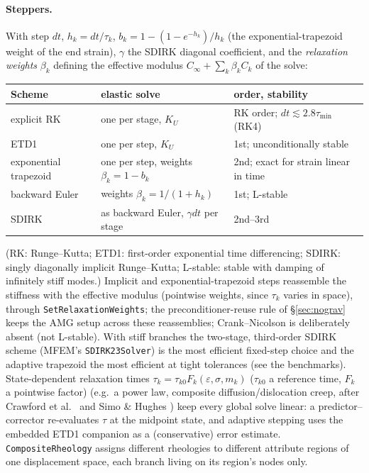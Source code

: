 \documentclass[11pt]{article}
\numberwithin{equation}{section}
\theoremstyle{remark}
\newcommand{\eps}{\varepsilon}
\newcommand{\code}[1]{\texttt{#1}}
\begin{document}
\paragraph{Steppers.} With step $dt$, $h_k = dt/\tau_k$,
$b_k = 1 - (1 - e^{-h_k})/h_k$ (the exponential-trapezoid weight of the end
strain), $\gamma$ the SDIRK diagonal coefficient, and the \emph{relaxation
weights} $\beta_k$ defining the effective modulus $C_\infty + \sum_k\beta_kC_k$
of the solve:
\begin{center}
\small
\begin{tabular}{@{}P{3.4cm}P{5.4cm}P{4.6cm}@{}}
\toprule
Scheme & elastic solve & order, stability \\
\midrule
explicit RK & one per stage, $K_U$ & RK order; $dt\lesssim2.8\tau_{\min}$ (RK4) \\
ETD1 & one per step, $K_U$ & 1st; unconditionally stable \\
exponential trapezoid & one per step, weights $\beta_k = 1 - b_k$ & 2nd; exact for strain linear in time \\
backward Euler & weights $\beta_k = 1/(1+h_k)$ & 1st; L-stable \\
SDIRK & as backward Euler, $\gamma dt$ per stage & 2nd--3rd \\
\bottomrule
\end{tabular}
\end{center}
(RK: Runge--Kutta; ETD1: first-order exponential time differencing;
SDIRK: singly diagonally implicit Runge--Kutta; L-stable: stable with
damping of infinitely stiff modes.) Implicit and exponential-trapezoid steps
reassemble the stiffness with the effective modulus (pointwise weights,
since $\tau_k$ varies in space), through \code{SetRelaxationWeights}; the
preconditioner-reuse rule of \S\ref{sec:nograv} keeps the AMG setup across
these reassemblies; Crank--Nicolson is
deliberately absent (not L-stable). With stiff branches the
two-stage, third-order SDIRK scheme (MFEM's \code{SDIRK23Solver}) is the most efficient fixed-step choice and the
adaptive trapezoid the most efficient at tight tolerances (see the
benchmarks).
State-dependent relaxation times $\tau_k = \tau_{k0}F_k(\eps,\sigma,m_k)$
($\tau_{k0}$ a reference time, $F_k$ a pointwise factor)
(e.g.\ a power law, composite diffusion/dislocation creep, after Crawford et
al.\ \cite{Crawford2017} and Simo \& Hughes \cite{SimoHughes}) keep every
global solve linear: a predictor--corrector re-evaluates $\tau$ at the
midpoint state, and adaptive stepping uses the embedded ETD1 companion as a
(conservative) error estimate. \code{CompositeRheology} assigns different
rheologies to different attribute regions of one displacement space, each
branch living on its region's nodes only.
\end{document}
